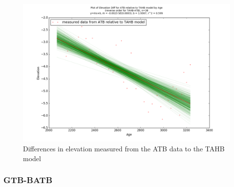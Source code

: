 \begin{figure}[H]
	\includegraphics[width=0.9\linewidth]{data/bothNonZero/withinSeventyFivePercent/gias/theGIA_ATB_relative_to_TAHB.png}
	\caption{Differences in elevation measured from the ATB data to the TAHB model}
	\label{fig:gias_ATBxTAHB}
\end{figure}
\newpage




\subsubsection{GTB-BATB}

